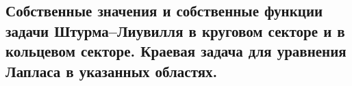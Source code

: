 \subsection{Собственные значения и собственные функции задачи Штурма–Лиувилля в круговом секторе и в кольцевом секторе. Краевая задача для уравнения Лапласа в указанных областях.}